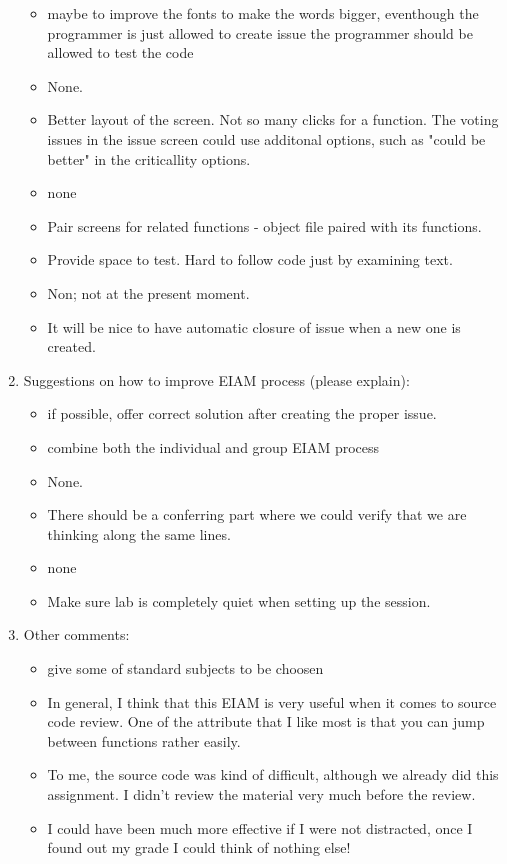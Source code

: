 \begin{enumerate}
\begin{itemize}
\item maybe to improve the fonts to make the words bigger,
eventhough the programmer is just allowed to create issue
the programmer should be allowed to test the code
\item None.



\item Better layout of the screen.  Not so many clicks for a function.  The
voting issues in the issue screen could use additonal options, such as
"could be better" in the criticallity options.
\item none
\item Pair screens for related functions - object file paired with its functions.
\item Provide space to test.  Hard to follow code just by examining text.
\item Non;  not at the present moment.
\item It will be nice to have automatic closure of issue when a new one is created.
\end{itemize}

\item  Suggestions on how to improve EIAM process (please explain):
\begin{itemize}
\item if possible, offer correct solution after creating the proper issue.
\item combine both the individual and group EIAM process
\item None.
\item There should be a conferring part where we could verify that we are
thinking along the same lines.
\item none
\item Make sure lab is completely quiet when setting up the session.
\end{itemize}


\item  Other comments:
\begin{itemize}
\item give some of standard subjects to be choosen
\item In general, I think that this EIAM is very useful when it comes to
source code review. One of the attribute that I like most is that you
can jump between functions rather easily.

\item To me, the source code was kind of difficult, although we already did
this assignment.  I didn't review the material very much before the review.
\item I could have been much more effective if I were not distracted, once I
found out my grade I could think of nothing else!




\end{itemize}
\end{enumerate}
